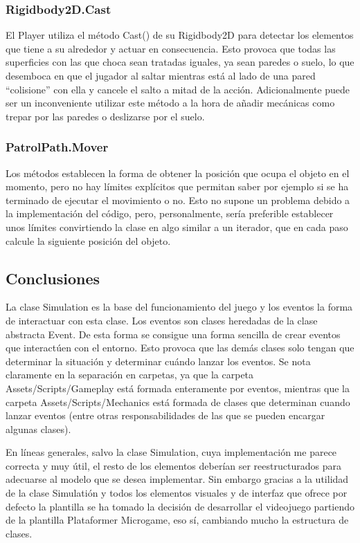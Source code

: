 \subsubsection{Rigidbody2D.Cast}
El Player utiliza el método Cast() de su Rigidbody2D para detectar los elementos que tiene a su alrededor y actuar en consecuencia. Esto provoca que todas las superficies con las que choca sean tratadas iguales, ya sean paredes o suelo, lo que desemboca en que el jugador al saltar mientras está al lado de una pared “colisione” con ella y cancele el salto a mitad de la acción. Adicionalmente puede ser un inconveniente utilizar este método a la hora de añadir mecánicas como trepar por las paredes o deslizarse por el suelo. 

\subsubsection{PatrolPath.Mover}
Los métodos establecen la forma de obtener la posición que ocupa el objeto en el momento, pero no hay límites explícitos que permitan saber por ejemplo si se ha terminado de ejecutar el movimiento o no. Esto no supone un problema debido a la implementación del código, pero, personalmente, sería preferible establecer unos límites convirtiendo la clase en algo similar a un iterador, que en cada paso calcule la siguiente posición del objeto.

\subsection{Conclusiones}
La clase Simulation es la base del funcionamiento del juego y los eventos la forma de interactuar con esta clase. Los eventos son clases heredadas de la clase abstracta Event. De esta forma se consigue una forma sencilla de crear eventos que interactúen con el entorno. Esto provoca que las demás clases solo tengan que determinar la situación y determinar cuándo lanzar los eventos. Se nota claramente en la separación en carpetas, ya que la carpeta Assets/Scripts/Gameplay está formada enteramente por eventos, mientras que la carpeta Assets/Scripts/Mechanics está formada de clases que determinan cuando lanzar eventos (entre otras responsabilidades de las que se pueden encargar algunas clases).

En líneas generales, salvo la clase Simulation, cuya implementación me parece correcta y muy útil, el resto de los elementos deberían ser reestructurados para adecuarse al modelo que se desea implementar. Sin embargo gracias a la utilidad de la clase Simulatión y todos los elementos visuales y de interfaz que ofrece por defecto la plantilla se ha tomado la decisión de desarrollar el videojuego partiendo de la plantilla Plataformer Microgame, eso sí, cambiando mucho la estructura de clases.

